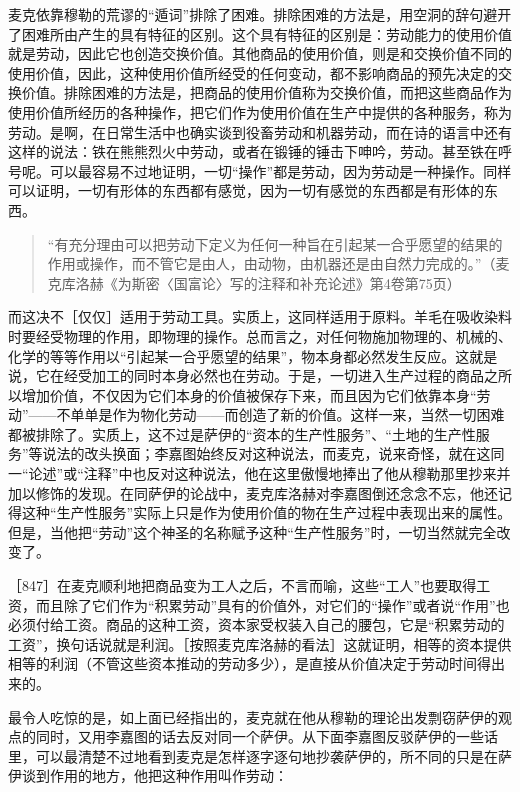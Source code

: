 麦克依靠穆勒的荒谬的“遁词”排除了困难。排除困难的方法是，用空洞的辞句避开了困难所由产生的具有特征的区别。这个具有特征的区别是：劳动能力的使用价值就是劳动，因此它也创造交换价值。其他商品的使用价值，则是和交换价值不同的使用价值，因此，这种使用价值所经受的任何变动，都不影响商品的预先决定的交换价值。排除困难的方法是，把商品的使用价值称为交换价值，而把这些商品作为使用价值所经历的各种操作，把它们作为使用价值在生产中提供的各种服务，称为劳动。是啊，在日常生活中也确实谈到役畜劳动和机器劳动，而在诗的语言中还有这样的说法：铁在熊熊烈火中劳动，或者在锻锤的锤击下呻吟，劳动。甚至铁在呼号呢。可以最容易不过地证明，一切“操作”都是劳动，因为劳动是一种操作。同样可以证明，一切有形体的东西都有感觉，因为一切有感觉的东西都是有形体的东西。

\begin{quote}{“有充分理由可以把劳动下定义为任何一种旨在引起某一合乎愿望的结果的作用或操作，而不管它是由人，由动物，由机器还是由自然力完成的。”（麦克库洛赫《为斯密〈国富论〉写的注释和补充论述》第4卷第75页）}\end{quote}

而这决不［仅仅］适用于劳动工具。实质上，这同样适用于原料。羊毛在吸收染料时要经受物理的作用，即物理的操作。总而言之，对任何物施加物理的、机械的、化学的等等作用以“引起某一合乎愿望的结果”，物本身都必然发生反应。这就是说，它在经受加工的同时本身必然也在劳动。于是，一切进入生产过程的商品之所以增加价值，不仅因为它们本身的价值被保存下来，而且因为它们依靠本身“劳动”——不单单是作为物化劳动——而创造了新的价值。这样一来，当然一切困难都被排除了。实质上，这不过是萨伊的“资本的生产性服务”、“土地的生产性服务”等说法的改头换面；李嘉图始终反对这种说法，而麦克，说来奇怪，就在这同一“论述”或“注释”中也反对这种说法，他在这里傲慢地捧出了他从穆勒那里抄来并加以修饰的发现。在同萨伊的论战中，麦克库洛赫对李嘉图倒还念念不忘，他还记得这种“生产性服务”实际上只是作为使用价值的物在生产过程中表现出来的属性。但是，当他把“劳动”这个神圣的名称赋予这种“生产性服务”时，一切当然就完全改变了。

［847］在麦克顺利地把商品变为工人之后，不言而喻，这些“工人”也要取得工资，而且除了它们作为“积累劳动”具有的价值外，对它们的“操作”或者说“作用”也必须付给工资。商品的这种工资，资本家受权装入自己的腰包，它是“积累劳动的工资”，换句话说就是利润。［按照麦克库洛赫的看法］这就证明，相等的资本提供相等的利润（不管这些资本推动的劳动多少），是直接从价值决定于劳动时间得出来的。

最令人吃惊的是，如上面已经指出的，麦克就在他从穆勒的理论出发剽窃萨伊的观点的同时，又用李嘉图的话去反对同一个萨伊。从下面李嘉图反驳萨伊的一些话里，可以最清楚不过地看到麦克是怎样逐字逐句地抄袭萨伊的，所不同的只是在萨伊谈到作用的地方，他把这种作用叫作劳动：

